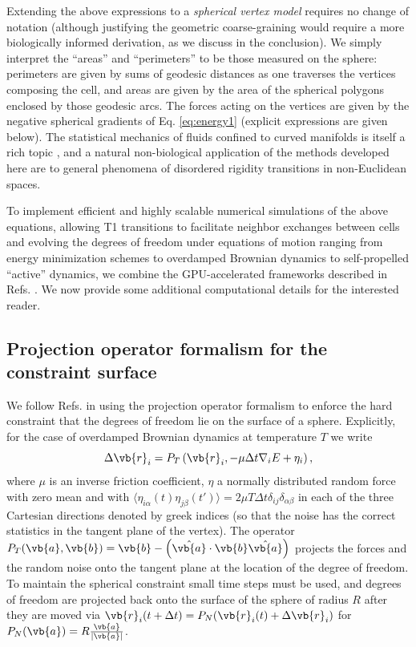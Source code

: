 \documentclass[aps,pre,reprint,superscriptaddress,nofootinbib]{revtex4-2}
\begin{document}
Extending the above expressions to a \emph{spherical vertex model} requires no change of notation (although justifying the geometric coarse-graining would require a more biologically informed derivation, as we discuss in the conclusion). We simply interpret the ``areas'' and ``perimeters'' to be those measured on the sphere: perimeters are given by sums of geodesic distances as one traverses the vertices composing the cell, and areas are given by the area of the spherical polygons enclosed by those geodesic arcs. The forces acting on the vertices are given by the negative spherical gradients of Eq. \ref{eq:energy1} (explicit expressions are given below). The statistical mechanics of fluids confined to curved manifolds is itself a rich topic \cite{tarjus2012statistical,guerra2018freezing}, and a natural non-biological application of the methods developed here are to general phenomena of disordered rigidity transitions in non-Euclidean spaces.

To implement efficient and highly scalable numerical simulations of the above equations, allowing T1 transitions to facilitate neighbor exchanges between cells and evolving the degrees of freedom under equations of motion ranging from energy minimization schemes to overdamped Brownian dynamics to self-propelled ``active'' dynamics, we combine the GPU-accelerated frameworks described in Refs. \cite{sussman2017cellGPU,sussman2019fast}. We now provide some additional computational details for the interested reader.

%
%
\subsection{Projection operator formalism for the constraint surface}
We follow Refs. \cite{SAMOS,sknepnek2015active} in using the projection operator formalism to enforce the hard constraint that the degrees of freedom lie on the surface of a sphere. Explicitly, for the case of overdamped Brownian dynamics at temperature $T$ we write
\begin{equation}
\Delta \vb{r}_i = P_T\left( \vb{r}_i, -\mu \Delta t \nabla_i E + \eta_i \right),
\end{equation}
where $\mu$ is an inverse friction coefficient, $\eta$ a normally distributed random force with zero mean and with $\langle \eta_{i\alpha}(t) \eta_{j\beta}(t') \rangle = 2\mu T\Delta t \delta_{ij}\delta_{\alpha\beta}$ in each of the three Cartesian directions denoted by greek indices (so that the noise has the correct statistics in the tangent plane of the vertex). The operator $P_T(\vb{a}, \vb{b}) = \vb{b} - \left(\hat{\vb{a}}\cdot\vb{b}\hat{\vb{a}}\right)$ projects the forces and the random noise onto the tangent plane at the location of the degree of freedom. To maintain the spherical constraint small time steps must be used, and degrees of freedom are projected back onto the surface of the sphere of radius $R$ after they are moved via $\vb{r}_i(t+\Delta t) = P_N(\vb{r}_i(t) + \Delta \vb{r}_i)$ for $P_N(\vb{a}) = R \frac{\vb{a}}{|\vb{a}|}$.
\end{document}
